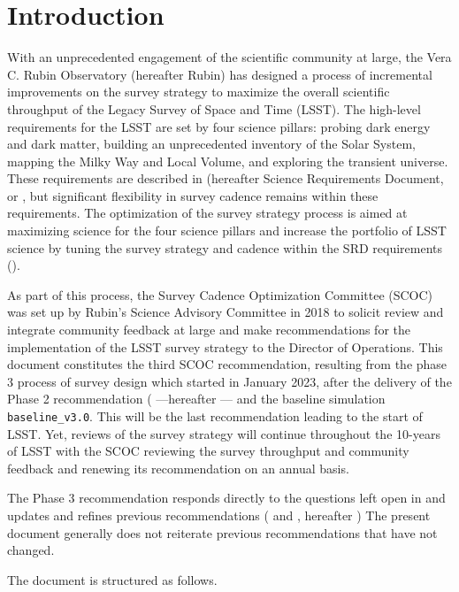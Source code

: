 \section{Introduction}

With an unprecedented engagement of the scientific community at large, the Vera C. Rubin Observatory (hereafter Rubin) has designed a process of incremental improvements on the survey strategy to maximize the overall scientific throughput of the Legacy Survey of Space and Time (LSST). The high-level requirements for the LSST are set by four science pillars: probing dark energy and dark matter, building an unprecedented inventory of the Solar System, mapping the Milky Way and Local Volume, and exploring the transient universe. These requirements are described in \cite{LPM-17} (hereafter Science Requirements Document, or , but significant flexibility in survey cadence remains within these requirements. The optimization of the survey strategy process is aimed at maximizing science for the four science pillars and increase the portfolio of LSST science by tuning the survey strategy and cadence within the SRD requirements ().

As part of this process, the Survey Cadence Optimization Committee (SCOC) was set up by Rubin's Science Advisory Committee in 2018 to solicit review and integrate community feedback at large and make recommendations for the implementation of the LSST survey strategy to the Director of Operations. This document constitutes the third SCOC recommendation, resulting from the phase 3 process of survey design which started in January 2023, after the delivery of the Phase 2 recommendation (\citealt{PSTN-055} ---hereafter --- and the baseline simulation \texttt{baseline\_v3.0}. This will be the last recommendation leading to the start of LSST. Yet, reviews of the survey strategy will continue throughout the 10-years of LSST with the SCOC reviewing the survey throughput and community feedback and renewing its recommendation on an annual basis. 

The Phase 3 recommendation responds directly to the questions left open in  and updates and refines previous recommendations ( and \cite{PSTN-053}, hereafter ) The present document generally does not reiterate previous recommendations that have not changed.

The document is structured as follows.






